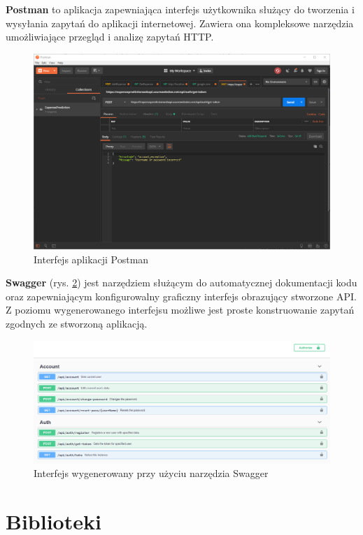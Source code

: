 \textbf{Postman} to aplikacja zapewniająca interfejs użytkownika służący do tworzenia i wysyłania zapytań do aplikacji internetowej. Zawiera ona kompleksowe narzędzia umożliwiające przegląd i analizę zapytań HTTP. \cite{postman}
\begin{figure}[!ht]
	\begin{center}
		\includegraphics[width=6in]{img/aplikacje/postman_interfejs.png}
		\caption{Interfejs aplikacji Postman}
		\label{postman_interfejs}
	\end{center}
\end{figure}

\textbf{Swagger} (rys. \ref{swagger_interfejs}) jest narzędziem służącym do automatycznej dokumentacji kodu oraz zapewniającym konfigurowalny graficzny interfejs obrazujący stworzone API. Z poziomu wygenerowanego interfejsu możliwe jest proste konstruowanie zapytań zgodnych ze stworzoną aplikacją.\cite{swagger}
\begin{figure}[!ht]
	\begin{center}
		\includegraphics[width=6in]{img/aplikacje/swagger_interfejs.png}
		\caption{Interfejs wygenerowany przy użyciu narzędzia Swagger}
		\label{swagger_interfejs}
	\end{center}
\end{figure}
\section{Biblioteki}


